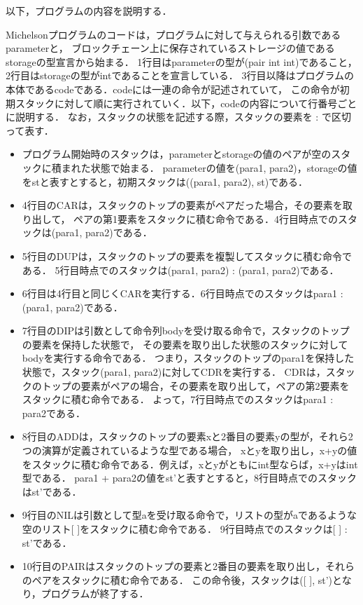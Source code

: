 \documentclass{kuisthesis}
\begin{document}
以下，プログラムの内容を説明する．

Michelsonプログラムのコードは，プログラムに対して与えられる引数であるparameterと，
ブロックチェーン上に保存されているストレージの値であるstorageの型宣言から始まる．
1行目はparameterの型が(pair int int)であること，2行目はstorageの型がintであることを宣言している．
3行目以降はプログラムの本体であるcodeである．codeには一連の命令が記述されていて，
この命令が初期スタックに対して順に実行されていく．以下，codeの内容について行番号ごとに説明する．
なお，スタックの状態を記述する際，スタックの要素を : で区切って表す．

\begin{itemize}
  \item プログラム開始時のスタックは，parameterとstorageの値のペアが空のスタックに積まれた状態で始まる．
  parameterの値を(para1, para2)，storageの値をstと表すとすると，初期スタックは((para1, para2), st)である．
  \item 4行目のCARは，スタックのトップの要素がペアだった場合，その要素を取り出して，
  ペアの第1要素をスタックに積む命令である．4行目時点でのスタックは(para1, para2)である．
  \item 5行目のDUPは，スタックのトップの要素を複製してスタックに積む命令である．
  5行目時点でのスタックは(para1, para2) : (para1, para2)である．
  \item 6行目は4行目と同じくCARを実行する．6行目時点でのスタックはpara1 : (para1, para2)である．
  \item 7行目のDIPは引数として命令列bodyを受け取る命令で，スタックのトップの要素を保持した状態で，
  その要素を取り出した状態のスタックに対してbodyを実行する命令である．
  つまり，スタックのトップのpara1を保持した状態で，スタック(para1, para2)に対してCDRを実行する．
  CDRは，スタックのトップの要素がペアの場合，その要素を取り出して，ペアの第2要素をスタックに積む命令である．
  よって，7行目時点でのスタックはpara1 : para2である．
  \item 8行目のADDは，スタックのトップの要素xと2番目の要素yの型が，それら2つの演算が定義されているような型である場合，
  xとyを取り出し，x+yの値をスタックに積む命令である．例えば，xとyがともにint型ならば，x+yはint型である．
  para1 + para2の値をst'と表すとすると，8行目時点でのスタックはst'である．
  \item 9行目のNILは引数として型aを受け取る命令で，リストの型がaであるような空のリスト[ ]をスタックに積む命令である．
  9行目時点でのスタックは[ ] : st'である．
  \item 10行目のPAIRはスタックのトップの要素と2番目の要素を取り出し，それらのペアをスタックに積む命令である．
  この命令後，スタックは([ ], st')となり，プログラムが終了する．
\end{itemize}
\end{document}
